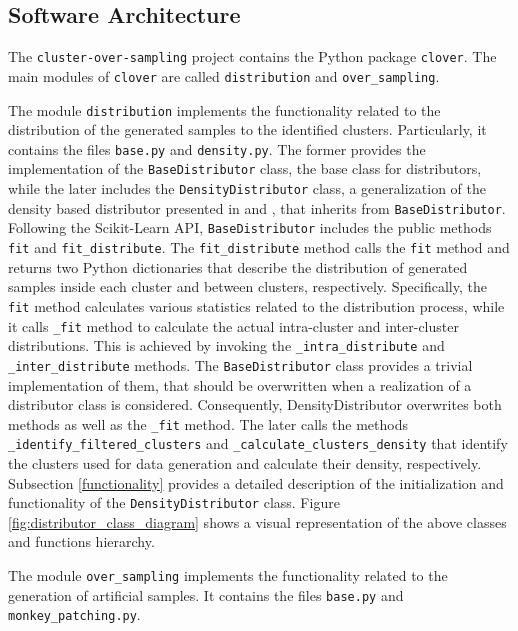 \documentclass[preprint,12pt, a4paper]{elsarticle}
\begin{document}
\subsection{Software Architecture}
\label{architecture}

The \texttt{cluster-over-sampling} project contains the Python package \texttt{clover}. The main modules of \texttt{clover} are called \texttt{distribution} and \texttt{over\_sampling}. 

The module \texttt{distribution} implements the functionality related to the distribution of the generated samples to the identified clusters. Particularly, it contains the files \texttt{base.py} and \texttt{density.py}. The former provides the implementation of the \texttt{BaseDistributor} class, the base class for distributors, while the later includes the \texttt{DensityDistributor} class, a generalization of the density based distributor presented in \cite{Douzas2017a} and \cite{Douzas2018}, that inherits from \texttt{BaseDistributor}. Following the Scikit-Learn API, \texttt{BaseDistributor} includes the public methods \texttt{fit} and \texttt{fit\_distribute}. The \texttt{fit\_distribute} method calls the \texttt{fit} method and returns two Python dictionaries that describe the distribution of generated samples inside each cluster and between clusters, respectively. Specifically, the \texttt{fit} method calculates various statistics related to the distribution process, while it calls \texttt{\_fit} method to calculate the actual intra-cluster and inter-cluster distributions. This is achieved by invoking the \texttt{\_intra\_distribute} and \texttt{\_inter\_distribute} methods. The \texttt{BaseDistributor} class provides a trivial implementation of them, that should be overwritten when a realization of a distributor class is considered. Consequently, \texttt{}{DensityDistributor} overwrites both methods as well as the \texttt{\_fit} method. The later calls the methods \texttt{\_identify\_filtered\_clusters} and \texttt{\_calculate\_clusters\_density} that identify the clusters used for data generation and calculate their density, respectively. Subsection \ref{functionality} provides a detailed description of the initialization and functionality of the \texttt{DensityDistributor} class. Figure \ref{fig:distributor_class_diagram} shows a visual representation of the above classes and functions hierarchy.

The module \texttt{over_sampling} implements the functionality related to the generation of artificial samples. It contains the files \texttt{base.py} and \texttt{monkey_patching.py}. 
\end{document}
